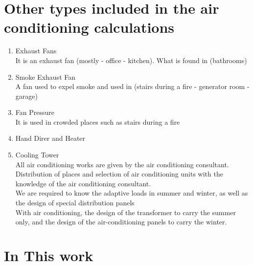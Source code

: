 \documentclass[12pt,fleqn]{book} %
\begin{document}
\section{Other types included in the air conditioning calculations}
\begin{enumerate}
    \item  Exhaust Fans
    \\ It is an exhaust fan (mostly - office - kitchen). What is found in (bathrooms)
    \item Smoke Exhaust Fan
    \\ A fan used to expel smoke and used in (stairs during a fire - generator room - garage)
    \item Fan Pressure
    \\ It is used in crowded places such as stairs during a fire 
    \item Hand Direr and Heater
    \item Cooling Tower
    \\ All air conditioning works are given by the air conditioning consultant.
\\Distribution of places and selection of air conditioning units with the knowledge of the air conditioning consultant.
\\We are required to know the adaptive loads in summer and winter, as well as the design of special distribution panels
\\With air conditioning, the design of the transformer to carry the summer only, and the design of the air-conditioning panels to carry the winter.

\end{enumerate}
\section{ In This work}
\end{document}

